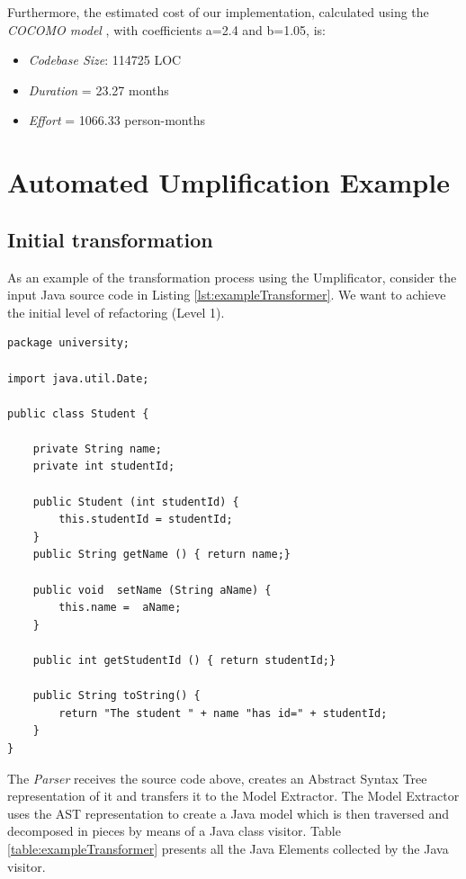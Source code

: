 Furthermore, the estimated cost of our implementation, calculated using the \textit{COCOMO model} \cite{COCOMO}, with coefficients a=2.4 and b=1.05, is:

\begin{itemize}
\item \textit{Codebase Size}:   114725 LOC
\item \textit{Duration} = 23.27 months
\item \textit{Effort} = 1066.33 person-months
\end{itemize}

\section{Automated Umplification Example}
\label{sec:automatedUmplification}
\subsection{Initial transformation}

As an example of the transformation process using the Umplificator, consider the input Java source code in Listing \ref{lst:exampleTransformer}.
We want to achieve the initial level of refactoring (Level 1).

\begin{lstlisting}[style=java, caption=Input source code, label=lst:exampleTransformer]
package university;

import java.util.Date;

public class Student {
	
    private String name;
    private int studentId;
    
    public Student (int studentId) {
    	this.studentId = studentId;
    }
    public String getName () { return name;}
    
    public void  setName (String aName) { 
    	this.name =  aName;
    }
   
    public int getStudentId () { return studentId;}
    
    public String toString() {
    	return "The student " + name "has id=" + studentId;
    }
}   
\end{lstlisting}

The \textit{Parser} receives the source code above, creates an Abstract Syntax Tree representation of it and transfers it to the Model Extractor. The Model Extractor uses the AST representation to create a Java model which is then traversed and decomposed in pieces by means of a Java class visitor. Table \ref{table:exampleTransformer} presents all the Java Elements collected by the Java visitor.


